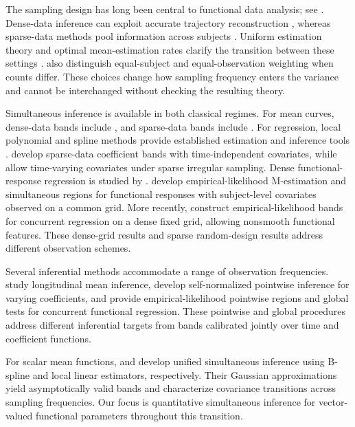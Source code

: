\documentclass[12pt]{article}
\numberwithin{equation}{section}
\begin{document}
The sampling design has long been central to functional data analysis; see \citet{wang_functional_2016}. Dense-data inference can exploit accurate trajectory reconstruction \citep{zhang_chen_2007}, whereas sparse-data methods pool information across subjects \citep{yao_functional_2005}. Uniform estimation theory and optimal mean-estimation rates clarify the transition between these settings \citep{li_hsing_2010,cai_optimal_2011}. \citet{zhang_wang_2016} also distinguish equal-subject and equal-observation weighting when counts differ. These choices change how sampling frequency enters the variance and cannot be interchanged without checking the resulting theory.

Simultaneous inference is available in both classical regimes. For mean curves, dense-data bands include \citet{degras_2011,cao_yang_todem_2012}, and sparse-data bands include \citet{ma_yang_carroll_2012,zheng_smooth_2014}. For regression, local polynomial and spline methods provide established estimation and inference tools \citep{wu_chiang_2000,huang_wu_zhou_2004,fan_simultaneous_2000}. \citet{gu_et_al_2014} develop sparse-data coefficient bands with time-independent covariates, while \citet{cao_simultaneous_2018} allow time-varying covariates under sparse irregular sampling. Dense functional-response regression is studied by \citet{zhu_li_kong_2012,chang_lin_ogden_2017}. \citet{zhou_el_2024} develop empirical-likelihood M-estimation and simultaneous regions for functional responses with subject-level covariates observed on a common grid. More recently, \citet{chang_mckeague_2024} construct empirical-likelihood bands for concurrent regression on a dense fixed grid, allowing nonsmooth functional features. These dense-grid results and sparse random-design results address different observation schemes.

Several inferential methods accommodate a range of observation frequencies. \citet{kim_zhao_2013} study longitudinal mean inference, \citet{chen_yao_2017} develop self-normalized pointwise inference for varying coefficients, and \citet{wang_et_al_2018} provide empirical-likelihood pointwise regions and global tests for concurrent functional regression. These pointwise and global procedures address different inferential targets from bands calibrated jointly over time and coefficient functions.

For scalar mean functions, \citet{cai_hu_2025} and \citet{LouWu2026} develop unified simultaneous inference using B-spline and local linear estimators, respectively. Their Gaussian approximations yield asymptotically valid bands and characterize covariance transitions across sampling frequencies. Our focus is quantitative simultaneous inference for vector-valued functional parameters throughout this transition.
\end{document}
